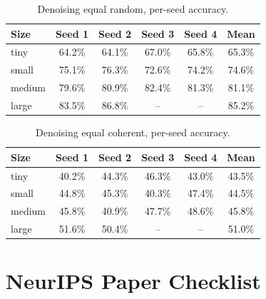\documentclass{article}
\begin{document}
\begin{table}[h]
\centering
\small
\begin{tabular}{lccccc}
\toprule
Size & Seed 1 & Seed 2 & Seed 3 & Seed 4 & Mean \\
\midrule
tiny   & 64.2\% & 64.1\% & 67.0\% & 65.8\% & 65.3\% \\
small  & 75.1\% & 76.3\% & 72.6\% & 74.2\% & 74.6\% \\
medium & 79.6\% & 80.9\% & 82.4\% & 81.3\% & 81.1\% \\
large  & 83.5\% & 86.8\% & --     & --     & 85.2\% \\
\bottomrule
\end{tabular}
\caption{Denoising equal random, per-seed accuracy.}
\label{tab:seeds_random}
\end{table}

\begin{table}[h]
\centering
\small
\begin{tabular}{lccccc}
\toprule
Size & Seed 1 & Seed 2 & Seed 3 & Seed 4 & Mean \\
\midrule
tiny   & 40.2\% & 44.3\% & 46.3\% & 43.0\% & 43.5\% \\
small  & 44.8\% & 45.3\% & 40.3\% & 47.4\% & 44.5\% \\
medium & 45.8\% & 40.9\% & 47.7\% & 48.6\% & 45.8\% \\
large  & 51.6\% & 50.4\% & --     & --     & 51.0\% \\
\bottomrule
\end{tabular}
\caption{Denoising equal coherent, per-seed accuracy.}
\label{tab:seeds_coherent}
\end{table}

\clearpage

\section*{NeurIPS Paper Checklist}
\end{document}
